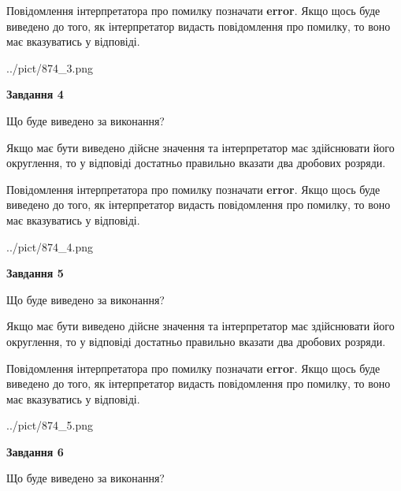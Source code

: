 \documentclass[12pt, ukrainian]{article}
\begin{document}
{\begin {Large}
Повідомлення інтерпретатора про помилку позначати \textbf{error}.
Якщо щось буде виведено до того, як інтерпретатор видасть повідомлення про помилку, 
то воно має вказуватись у відповіді. \par

\begin{center}
	{../pict/874_3.png}
\end{center}
\newpage

{\begin {center}\textbf{Завдання 4}\end {center}}\par
Що буде виведено за виконання? \par

Якщо має бути виведено дійсне значення та інтерпретатор має здійснювати його округлення, 
то у відповіді достатньо правильно вказати два дробових розряди.

Повідомлення інтерпретатора про помилку позначати \textbf{error}.
Якщо щось буде виведено до того, як інтерпретатор видасть повідомлення про помилку, 
то воно має вказуватись у відповіді. \par

\begin{center}
	{../pict/874_4.png}
\end{center}
\newpage

{\begin {center}\textbf{Завдання 5}\end {center}}\par
Що буде виведено за виконання? \par

Якщо має бути виведено дійсне значення та інтерпретатор має здійснювати його округлення, 
то у відповіді достатньо правильно вказати два дробових розряди.

Повідомлення інтерпретатора про помилку позначати \textbf{error}.
Якщо щось буде виведено до того, як інтерпретатор видасть повідомлення про помилку, 
то воно має вказуватись у відповіді. \par

\begin{center}
	{../pict/874_5.png}
\end{center}
\newpage

{\begin {center}\textbf{Завдання 6}\end {center}}\par
Що буде виведено за виконання? \par


\end{Large}}
\end{document}
